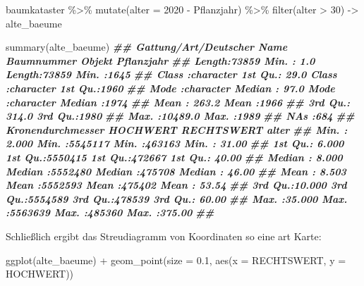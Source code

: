 \documentclass[
  ngerman,
]{article}
\newenvironment{Shaded}{\begin{snugshade}}{\end{snugshade}}
\newcommand{\AttributeTok}[1]{\textcolor[rgb]{0.77,0.63,0.00}{#1}}
\newcommand{\DecValTok}[1]{\textcolor[rgb]{0.00,0.00,0.81}{#1}}
\newcommand{\DocumentationTok}[1]{\textcolor[rgb]{0.56,0.35,0.01}{\textbf{\textit{#1}}}}
\newcommand{\FloatTok}[1]{\textcolor[rgb]{0.00,0.00,0.81}{#1}}
\newcommand{\FunctionTok}[1]{\textcolor[rgb]{0.00,0.00,0.00}{#1}}
\newcommand{\NormalTok}[1]{#1}
\newcommand{\OtherTok}[1]{\textcolor[rgb]{0.56,0.35,0.01}{#1}}
\newcommand{\SpecialCharTok}[1]{\textcolor[rgb]{0.00,0.00,0.00}{#1}}
\begin{document}
\begin{Shaded}
\begin{Highlighting}[]
\NormalTok{baumkataster }\SpecialCharTok{\%\textgreater{}\%}
  \FunctionTok{mutate}\NormalTok{(}\AttributeTok{alter =} \DecValTok{2020} \SpecialCharTok{{-}}\NormalTok{ Pflanzjahr) }\SpecialCharTok{\%\textgreater{}\%}
  \FunctionTok{filter}\NormalTok{(alter }\SpecialCharTok{\textgreater{}} \DecValTok{30}\NormalTok{) }\OtherTok{{-}\textgreater{}}
\NormalTok{  alte\_baeume}

\FunctionTok{summary}\NormalTok{(alte\_baeume)}
\DocumentationTok{\#\#  Gattung/Art/Deutscher Name   Baumnummer         Objekt            Pflanzjahr  }
\DocumentationTok{\#\#  Length:73859               Min.   :    1.0   Length:73859       Min.   :1645  }
\DocumentationTok{\#\#  Class :character           1st Qu.:   29.0   Class :character   1st Qu.:1960  }
\DocumentationTok{\#\#  Mode  :character           Median :   97.0   Mode  :character   Median :1974  }
\DocumentationTok{\#\#                             Mean   :  263.2                      Mean   :1966  }
\DocumentationTok{\#\#                             3rd Qu.:  314.0                      3rd Qu.:1980  }
\DocumentationTok{\#\#                             Max.   :10489.0                      Max.   :1989  }
\DocumentationTok{\#\#                             NA\textquotesingle{}s   :684                                        }
\DocumentationTok{\#\#  Kronendurchmesser    HOCHWERT         RECHTSWERT         alter       }
\DocumentationTok{\#\#  Min.   : 2.000    Min.   :5545117   Min.   :463163   Min.   : 31.00  }
\DocumentationTok{\#\#  1st Qu.: 6.000    1st Qu.:5550415   1st Qu.:472667   1st Qu.: 40.00  }
\DocumentationTok{\#\#  Median : 8.000    Median :5552480   Median :475708   Median : 46.00  }
\DocumentationTok{\#\#  Mean   : 8.503    Mean   :5552593   Mean   :475402   Mean   : 53.54  }
\DocumentationTok{\#\#  3rd Qu.:10.000    3rd Qu.:5554589   3rd Qu.:478539   3rd Qu.: 60.00  }
\DocumentationTok{\#\#  Max.   :35.000    Max.   :5563639   Max.   :485360   Max.   :375.00  }
\DocumentationTok{\#\# }
\end{Highlighting}
\end{Shaded}

Schließlich ergibt das Streudiagramm von Koordinaten so eine art Karte:

\begin{Shaded}
\begin{Highlighting}[]
\FunctionTok{ggplot}\NormalTok{(alte\_baeume) }\SpecialCharTok{+}
    \FunctionTok{geom\_point}\NormalTok{(}\AttributeTok{size =} \FloatTok{0.1}\NormalTok{, }\FunctionTok{aes}\NormalTok{(}\AttributeTok{x =}\NormalTok{ RECHTSWERT, }\AttributeTok{y =}\NormalTok{ HOCHWERT))}
\end{Highlighting}
\end{Shaded}
\end{document}

